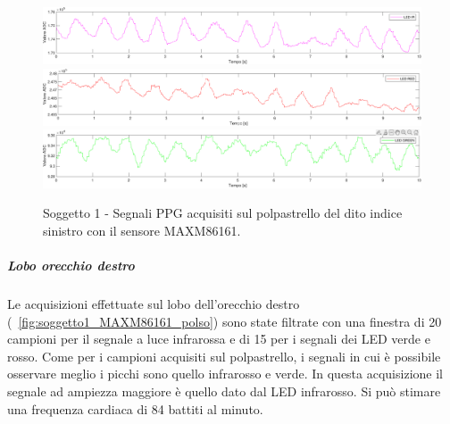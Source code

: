 \begin{figure}[h]
	\centering
	\includegraphics[width=1\linewidth]{ImageFiles/Misure Preliminari/Soggetto 1/MAXM86161/polpastrello_ired}
	\includegraphics[width=1\linewidth]{ImageFiles/Misure Preliminari/Soggetto 1/MAXM86161/polpastrello_red}
	\includegraphics[width=1\linewidth]{ImageFiles/Misure Preliminari/Soggetto 1/MAXM86161/polpastrello_green}
	\caption{Soggetto 1 - Segnali PPG acquisiti sul polpastrello del dito indice sinistro con il sensore MAXM86161.}
	\label{fig:soggetto1_MAXM86161_polpastrello}
\end{figure}

\clearpage

\subparagraph{Lobo orecchio destro}

Le acquisizioni effettuate sul lobo dell'orecchio destro (\Fig~\ref{fig:soggetto1_MAXM86161_polso}) sono state filtrate con una finestra di 20 campioni per il segnale a luce infrarossa e di 15 per i segnali dei LED verde e rosso. Come per i campioni acquisiti sul polpastrello, i segnali in cui è possibile osservare meglio i picchi sono quello infrarosso e verde. In questa acquisizione il segnale ad ampiezza maggiore è quello dato dal LED infrarosso. Si può stimare una frequenza cardiaca di 84 battiti al minuto.

